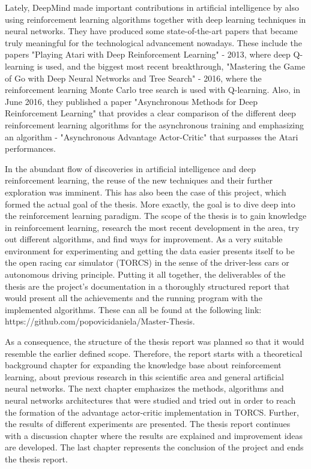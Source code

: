Lately, DeepMind made important contributions in artificial intelligence by also using reinforcement learning algorithms together with deep learning techniques in neural networks. They have produced some state-of-the-art papers that became truly meaningful for the technological advancement nowadays. These include the papers "Playing Atari with Deep Reinforcement Learning" \cite{DBLP:journals/corr/MnihKSGAWR13} - 2013, where deep Q-learning is used, and the biggest most recent breakthrough, "Mastering the Game of Go with Deep Neural Networks and Tree Search" \cite{Silver_2016} - 2016, where the reinforcement learning Monte Carlo tree search is used with Q-learning. Also, in June 2016, they published a paper "Asynchronous Methods for Deep Reinforcement Learning" \cite{DBLP:journals/corr/MnihBMGLHSK16} that provides a clear comparison of the different deep reinforcement learning algorithms for the asynchronous training and emphasizing an algorithm - "Asynchronous Advantage Actor-Critic" that surpasses the Atari performances.

In the abundant flow of discoveries in artificial intelligence and deep reinforcement learning, the reuse of the new techniques and their further exploration was imminent. This has also been the case of this project, which formed the actual goal of the thesis. More exactly, the goal is to dive deep into the reinforcement learning paradigm. The scope of the thesis is to gain knowledge in reinforcement learning, research the most recent development in the area, try out different algorithms, and find ways for improvement. As a very suitable environment for experimenting and getting the data easier presents itself to be the open racing car simulator (TORCS) in the sense of the driver-less cars or autonomous driving principle. Putting it all together, the deliverables of the thesis are the project's documentation in a thoroughly structured report that would present all the achievements and the running program with the implemented algorithms. These can all be found at the following link: https://github.com/popovicidaniela/Master-Thesis.

As a consequence, the structure of the thesis report was planned so that it would resemble the earlier defined scope. Therefore, the report starts with a theoretical background chapter for expanding the knowledge base about reinforcement learning, about previous research in this scientific area and general artificial neural networks. The next chapter emphasizes the methods, algorithms and neural networks architectures that were studied and tried out in order to reach the formation of the advantage actor-critic implementation in TORCS. Further, the results of different experiments are presented. The thesis report continues with a discussion chapter where the results are explained and improvement ideas are developed. The last chapter represents the conclusion of the project and ends the thesis report.